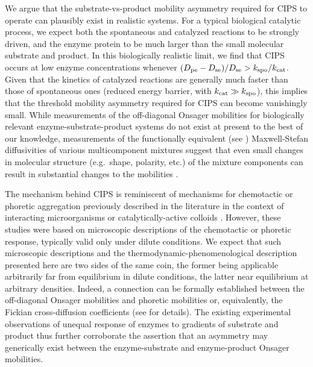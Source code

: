 We argue that the substrate-vs-product mobility asymmetry required for CIPS to operate can plausibly exist in realistic systems. For a typical biological catalytic process, we expect both the spontaneous and catalyzed reactions to be strongly driven, and the enzyme protein to be much larger than the small molecular substrate and product. In this biologically realistic limit, we find \cite{suppmat} that CIPS occurs at low enzyme concentrations whenever ${(D_{\mathrm{pe}}-D_{\mathrm{se}})}/{D_{\mathrm{se}}} > {k_{\mathrm{spo}}}/{k_{\mathrm{cat}}}$. Given that the kinetics of catalyzed reactions are generally much faster than those of spontaneous ones (reduced energy barrier, with $k_{\mathrm{cat}}\gg k_{\mathrm{spo}}$), this implies that the threshold mobility asymmetry required for CIPS can become vanishingly small. While measurements of the off-diagonal Onsager mobilities for biologically relevant enzyme-substrate-product systems do not exist at present to the best of our knowledge, measurements of the functionally equivalent (see \cite{suppmat}) Maxwell-Stefan diffusivities of various multicomponent mixtures suggest that even small changes in molecular structure (e.g.~shape, polarity, etc.) of the mixture components can result in substantial changes to the mobilities \cite{taylor1993multicomponent,guevara2016mutual,guevara2018interplay,ramm2021diffusiophoretic,vanag2009cross}.




The mechanism behind CIPS is reminiscent of mechanisms for chemotactic or phoretic aggregation previously described in the literature in the context of interacting microorganisms or catalytically-active colloids \cite{saha2014clusters,golestanian2019phoretic,agudo-canalejoActivePhaseSeparation2019,keller1970initiation}. However, these studies were based on microscopic descriptions of the chemotactic or phoretic response, typically valid only under dilute conditions. We expect that such microscopic descriptions and the thermodynamic-phenomenological description presented here are two sides of the same coin, the former being applicable arbitrarily far from equilibrium in dilute conditions, the latter near equilibrium at arbitrary densities.
Indeed, a connection can be formally established between the off-diagonal Onsager mobilities and phoretic mobilities \cite{golestanian2019phoretic,anderson1989colloid} or, equivalently, the Fickian cross-diffusion coefficients \cite{vanag2009cross} (see \cite{suppmat} for details). The existing experimental observations \cite{agudo2018enhanced,zhang2021chemically} of unequal response of enzymes to gradients of substrate and product thus further corroborate the assertion that an asymmetry may generically exist between the enzyme-substrate and enzyme-product Onsager mobilities.





